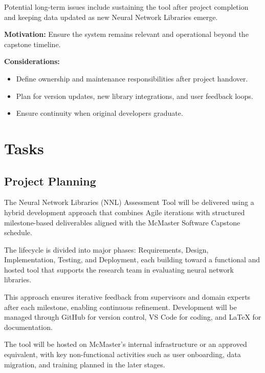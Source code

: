 \documentclass[12pt]{article}
\begin{document}
Potential long-term issues include sustaining the tool after project completion and keeping data updated as new Neural Network Libraries emerge.

\textbf{Motivation:} Ensure the system remains relevant and operational beyond the capstone timeline.

\textbf{Considerations:}
\begin{itemize}
    \item Define ownership and maintenance responsibilities after project handover.
    \item Plan for version updates, new library integrations, and user feedback loops.
    \item Ensure continuity when original developers graduate.
\end{itemize}


\section{Tasks}

\subsection{Project Planning}

The Neural Network Libraries (NNL) Assessment Tool will be delivered using a hybrid development approach that combines Agile iterations with structured milestone-based deliverables aligned with the McMaster Software Capstone schedule.

The lifecycle is divided into major phases: Requirements, Design, Implementation, Testing, and Deployment, each building toward a functional and hosted tool that supports the research team in evaluating neural network libraries.

This approach ensures iterative feedback from supervisors and domain experts after each milestone, enabling continuous refinement. Development will be managed through GitHub for version control, VS Code for coding, and LaTeX for documentation.

The tool will be hosted on McMaster’s internal infrastructure or an approved equivalent, with key non-functional activities such as user onboarding, data migration, and training planned in the later stages.
\end{document}
